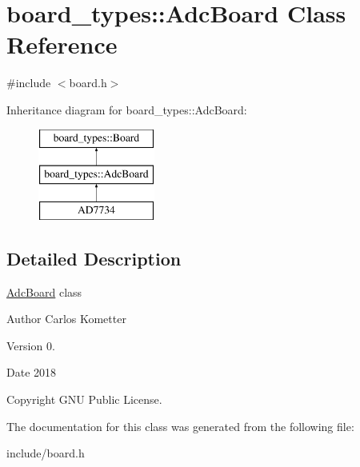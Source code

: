 \hypertarget{classboard__types_1_1AdcBoard}{}\section{board\+\_\+types\+:\+:Adc\+Board Class Reference}
\label{classboard__types_1_1AdcBoard}


{\ttfamily \#include $<$board.\+h$>$}

Inheritance diagram for board\+\_\+types\+:\+:Adc\+Board\+:\begin{figure}[H]
\begin{center}
\leavevmode
\includegraphics[height=3.000000cm]{classboard__types_1_1AdcBoard}
\end{center}
\end{figure}


\subsection{Detailed Description}
\mbox{\hyperlink{classboard__types_1_1AdcBoard}{Adc\+Board}} class \begin{DoxyAuthor}{Author}
Carlos Kometter 
\end{DoxyAuthor}
\begin{DoxyVersion}{Version}
0. 
\end{DoxyVersion}
\begin{DoxyDate}{Date}
2018 
\end{DoxyDate}
\begin{DoxyCopyright}{Copyright}
G\+NU Public License. 
\end{DoxyCopyright}


The documentation for this class was generated from the following file\+:\begin{DoxyCompactItemize}
\item 
include/board.\+h\end{DoxyCompactItemize}
